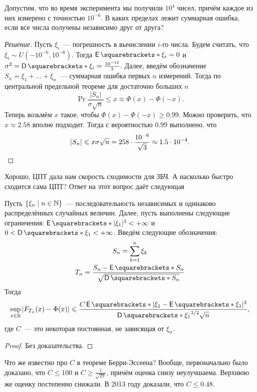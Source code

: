 \begin{example}
	Допустим, что во время эксперимента мы получили \(10^{4}\) чисел, причём 
	каждое из них измерено с точностью \(10^{-6}\). В каких пределах лежит 
	суммарная ошибка, если все числа получены независимо друг от друга?
\end{example}
\begin{proof}[Решение]
	Пусть \(\xi_{i}\)~--- погрешность в вычислении \(i\)-го числа. Будем 
	считать, что \(\xi_{i} \sim U(-10^{-6}, 10^{-6})\). Тогда \(\E{\xi_{i}} = 
	0\) и \(\sigma^2 = \D{\xi_{i}} = \frac{10^{-12}}{3}\). Далее, введём 
	обозначение \(S_n = \xi_{1} + \dots + \xi_{n}\)~--- суммарная ошибка первых 
	\(n\) измерений. Тогда по центральной предельной теореме для достаточно 
	больших \(n\)
	\[
		\Pr{\frac{|S_n|}{\sigma\sqrt{n}} \leq x} \approx \Phi(x) - \Phi(-x).
	\]
	Теперь возьмём \(x\) такое, чтобы \(\Phi(x) - \Phi(-x) \geq 0.99\). Можно 
	проверить, что \(x \approx 2.58\) вполне подходит. Тогда с вероятностью 
	\(0.99\) выполнено, что
	\[
		|S_n| \leq x\sigma\sqrt{n} = 258 \cdot \frac{10^{-6}}{\sqrt{3}} \approx 
		1.5 \cdot 10^{-4}.\qedhere
	\]
\end{proof}

Хорошо, ЦПТ дала нам скорость сходимости для ЗБЧ. А насколько быстро сходится 
сама ЦПТ? Ответ на этот вопрос даёт следующая 
\begin{theorem}
	Пусть \(\{\xi_{n} \mid n \in \N\}\)~--- последовательность независимых и 
	одинаково распределённых случайных величин. Далее, пусть выполнены 
	следующие ограничения: \(\E{|\xi_1|^3} < +\infty\) и \(0 < \D{\xi_1} < 
	+\infty\). Введём следующие обозначения:
	\begin{gather*}
		S_n = \sum_{k = 1}^{n} \xi_{k} \\
		T_n = \frac{S_n - \E{S_n}}{\sqrt{\D{S_n}}}
	\end{gather*}
	Тогда
	\[
		\sup_{x \in \R} \left|F_{T_n}(x) - \Phi(x)\right| \leq 
		\frac{C\E{|\xi_1 - \E{\xi_1}|^3}}{\D{\xi_{1}}^{3/2}\sqrt{n}},
	\]
	где \(C\)~--- это некоторая постоянная, не зависящая от \(\xi_{n}\).
\end{theorem}
\begin{proof}
	Без доказательства.
\end{proof}
Что же известно про \(C\) в теореме Берри-Эссеена? Вообще, первоначально было 
доказано, что \(C \leq 100\) и \(C \geq \frac{1}{\sqrt{2\pi}}\), причём оценка 
снизу неулучшаема. Верхнюю же оценку постепенно снижали. В 2013 году доказали, 
что \(C \leq 0.48\).

